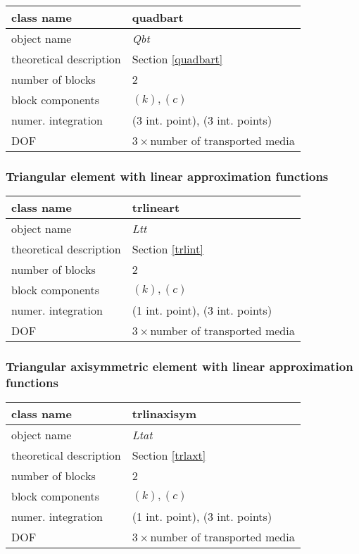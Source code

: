 \begin{center}
\begin{tabular}{|l|l|}
\hline
class name & {\sf quadbart}
\\ \hline
object name & {\it Qbt}
\\ \hline
theoretical description & Section \ref{quadbart}
\\ \hline
number of blocks & 2
\\ \hline
block components & $(k), (c)$
\\ \hline
numer. integration & (3 int. point), (3 int. points)
\\ \hline
DOF & $3 \times$number of transported media
\\ \hline
\end{tabular}
\end{center}


\subsubsection{Triangular element with linear approximation functions}

\begin{center}
\begin{tabular}{|l|l|}
\hline
class name & {\sf trlineart}
\\ \hline
object name & {\it Ltt}
\\ \hline
theoretical description & Section \ref{trlint}
\\ \hline
number of blocks & 2
\\ \hline
block components & $(k), (c)$
\\ \hline
numer. integration & (1 int. point), (3 int. points)
\\ \hline
DOF & $3 \times$number of transported media
\\ \hline
\end{tabular}
\end{center}


\subsubsection{Triangular axisymmetric element with linear approximation functions}

\begin{center}
\begin{tabular}{|l|l|}
\hline
class name & {\sf trlinaxisym}
\\ \hline
object name & {\it Ltat}
\\ \hline
theoretical description & Section \ref{trlaxt}
\\ \hline
number of blocks & 2
\\ \hline
block components & $(k), (c)$
\\ \hline
numer. integration & (1 int. point), (3 int. points)
\\ \hline
DOF & $3 \times$number of transported media
\\ \hline
\end{tabular}
\end{center}


